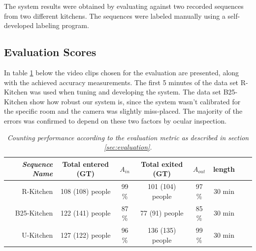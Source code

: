 The system results were obtained by evaluating against two recorded sequences from two different kitchens. The sequences were labeled manually using a self-developed labeling program.

\subsection{Evaluation Scores}
In table \ref{tab:evaluation_performance} below the video clips chosen for the evaluation are presented, along with the achieved accuracy measurements. The first 5 minutes of the data set R-Kitchen was used when tuning and developing the system. The data set B25-Kitchen show how robust our system is, since the system wasn't calibrated for the specific room and the camera was slightly miss-placed. The majority of the errors was confirmed to depend on these two factors by ocular inspection.

\begin{table}[h]
\centering
	\begin{tabular}{r | c | c | c | c | c | c | c }
	\emph{Sequence Name}		&  Total entered (GT) & \emph{$A_{in}$} & Total exited (GT) & \emph{$A_{out}$} & length \\
		\hline \hline
		R-Kitchen			& 108 (108) people & 99 \% & 101 (104) people & 97 \% & 30 min\\
		B25-Kitchen			& 122 (141) people & 87 \% & 77 (91) people & 85 \% & 30 min \\
		U-Kitchen			& 127 (122) people & 96 \% & 136 (135) people & 99 \% & 30 min  \\
		\end{tabular}
	\caption[System performance]{\textit{Counting performance according to the evaluation metric as described in section \ref{sec:evaluation}.}}
	\label{tab:evaluation_performance}
\end{table}

